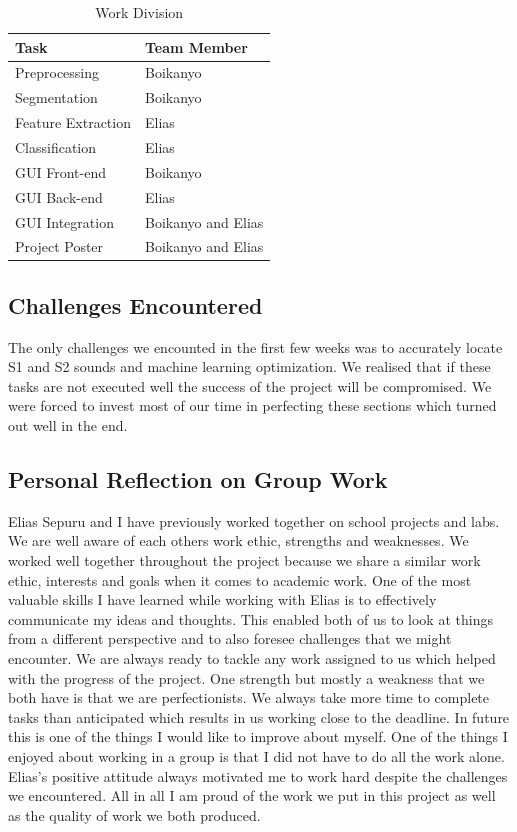 \documentclass[10pt,twocolumn]{witseiepaper}
\begin{document}
\begin{table}[h!]
\centering
\caption{Work Division}
\label{undefined}
\begin{tabular}{|l|l|}
\hline
\textbf{Task} & \textbf{Team Member} \\ \hline
Preprocessing & Boikanyo \\ \hline
Segmentation & Boikanyo \\ \hline
Feature Extraction & Elias \\ \hline
Classification & Elias \\ \hline
GUI Front-end & Boikanyo \\ \hline
GUI Back-end & Elias \\ \hline
GUI Integration & Boikanyo and Elias \\ \hline
Project Poster & Boikanyo and Elias \\ \hline
\end{tabular}
\end{table}

\subsection{\textbf{Challenges Encountered}}
The only challenges we encounted in the first few weeks was to accurately locate S1 and S2 sounds and machine learning optimization. We realised that if these tasks are not executed well the success of the project will be compromised. We were forced to invest most of our time in perfecting these sections which turned out well in the end.

\subsection{\textbf{Personal Reflection on Group Work}}
Elias Sepuru and I have previously worked together on school projects and labs. We are well aware of each others work ethic, strengths and weaknesses. We worked well together throughout the project because we share a similar work ethic, interests and goals when it comes to academic work. One of the most valuable skills I have learned while working with Elias is to effectively communicate my ideas and thoughts. This enabled both of us to look at things from a different perspective and to also foresee challenges that we might encounter. We are always ready to tackle any work assigned to us which  helped with the progress of the project. One strength but mostly a weakness that we both have is that we are perfectionists. We always take more time to complete tasks than anticipated which results in us working close to the deadline. In future this is one of the things I would like to improve about myself. One of the things I enjoyed about working in a group is that I did not have to do all the work alone. Elias's positive attitude always motivated me to work hard despite the challenges we encountered. All in all I am proud of the work we put in this project as well as the quality of work we both produced.
\end{document}
